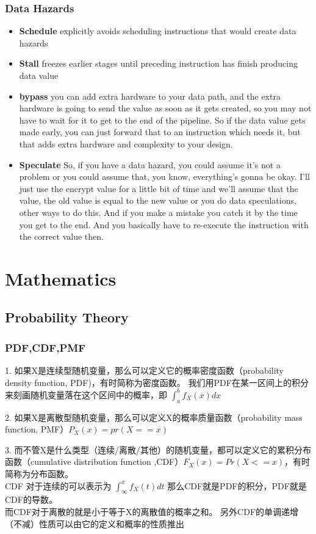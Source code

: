 \documentclass[UTF8]{article}
\begin{document}
\subsubsection{Data Hazards}
\begin{itemize}
	\item \textbf{Schedule} explicitly avoids scheduling instructions that would create data hazards
	\item \textbf{Stall} freezes earlier stages until preceding instruction has finish producing data value
	\item \textbf{bypass} you can add extra hardware to your data path, and the extra hardware is going to send the value as soon as it gets created, so you may not have to wait for it to get to the end of the pipeline. So if the data value gets made early, you can just forward that to an instruction which needs it, but that adds extra hardware and complexity to your design. 
	\item \textbf{Speculate} So, if you have a data hazard, you could assume it's not a problem or you could assume that, you know, everything's gonna be okay. I'll just use the encrypt value for a little bit of time and we'll assume that the value, the old value is equal to the new value or you do data speculations, other ways to do this. And if you make a mistake you catch it by the time you get to the end. And you basically have to re-execute the instruction with the correct value then.  
\end{itemize}

\section{Mathematics}
\subsection{Probability Theory}
\subsubsection{PDF,CDF,PMF}
1. 如果X是连续型随机变量，那么可以定义它的概率密度函数（probability density function, PDF)，有时简称为密度函数。 我们用PDF在某一区间上的积分来刻画随机变量落在这个区间中的概率，即 $\int^b_a f_X(x) dx$ 

2. 如果X是离散型随机变量，那么可以定义X的概率质量函数（probability mass function, PMF）$P_X(x) = pr(X == x)$

3. 而不管X是什么类型（连续/离散/其他）的随机变量，都可以定义它的累积分布函数（cumulative distribution function ,CDF）$F_X(x) = Pr(X <= x)$，有时简称为分布函数。 \\CDF 对于连续的可以表示为 $\int_{\infty}^x f_X(t) dt$ 那么CDF就是PDF的积分，PDF就是CDF的导数。 \\而CDF对于离散的就是小于等于X的离散值的概率之和。 另外CDF的单调递增（不减）性质可以由它的定义和概率的性质推出
\end{document}
